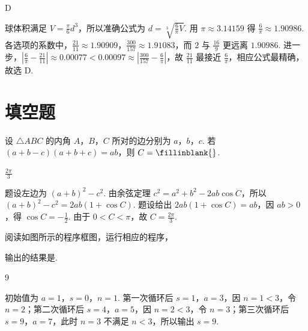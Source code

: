 \begin{answer}
D
\end{answer}

\begin{solution}
球体积满足 \(V=\frac\pi6d^3\)，所以准确公式为 \(d=\sqrt[3]{\frac6\pi V}\). 用 \(\pi\approx3.14159\) 得 \(\frac6\pi\approx1.90986\). 各选项的系数中，\(\frac{21}{11}\approx1.90909\)，\(\frac{300}{157}\approx1.91083\)，而 \(2\) 与 \(\frac{16}{9}\) 更远离 \(1.90986\). 进一步，\(\left|\frac6\pi-\frac{21}{11}\right|\approx0.00077<0.00097\approx\left|\frac{300}{157}-\frac6\pi\right|\)，故 \(\frac{21}{11}\) 最接近 \(\frac6\pi\)，相应公式最精确，故选 D.
\end{solution}

\section{填空题}

\begin{problem}
设 \(\triangle ABC\) 的内角 \(A\)，\(B\)，\(C\) 所对的边分别为 \(a\)，\(b\)，\(c\). 若 \((a + b - c)(a + b + c) = ab\)，则 \(C =\fillinblank{}\).
\end{problem}

\begin{answer}
\(\frac{2\pi}{3}\)
\end{answer}

\begin{solution}
题设左边为 \((a+b)^2-c^2\). 由余弦定理 \(c^2=a^2+b^2-2ab\cos C\)，所以 \((a+b)^2-c^2=2ab(1+\cos C)\). 题设给出 \(2ab(1+\cos C)=ab\)，因 \(ab>0\)，得 \(\cos C=-\frac12\). 由于 \(0<C<\pi\)，故 \(C=\frac{2\pi}{3}\).
\end{solution}

\begin{problem}
阅读如图所示的程序框图，运行相应的程序，

输出的结果是\fillinblank{}.

\end{problem}

\begin{answer}
9
\end{answer}

\begin{solution}
初始值为 \(a=1\)，\(s=0\)，\(n=1\). 第一次循环后 \(s=1\)，\(a=3\)，因 \(n=1<3\)，令 \(n=2\)；第二次循环后 \(s=4\)，\(a=5\)，因 \(n=2<3\)，令 \(n=3\)；第三次循环后 \(s=9\)，\(a=7\)，此时 \(n=3\) 不满足 \(n<3\)，所以输出 \(s=9\).
\end{solution}

